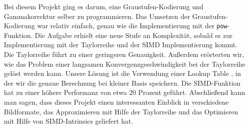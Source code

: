 \documentclass[course=erap]{aspdoc}
\begin{document}
\par
Bei diesem Projekt ging es darum, eine Graustufen-Kodierung und Gammakorrektur selber zu programmieren. Das Umsetzen der Graustufen-Kodierung war relativ einfach, genau wie die Implementierung mit der \texttt{pow}-Funktion. Die Aufgabe erhielt eine neue Stufe an Komplexität, sobald es zur Implementierung mit der Taylorreihe und der SIMD Implementierung kommt. Die Taylorreihe führt zu einer geringeren Genauigkeit. Außerdem erörterten wir, wie das Problem einer langsamen Konvergenzgeschwindigkeit bei der Taylorreihe gelöst werden kann. Unsere Lösung ist die Verwendung einer Lookup Table \cite{jungck2011packetC}, in der wir die genaue Berechnung bei kleiner Basis speichern. Die SIMD-Funktion hat zu einer höhere Performanz von etwa 20 Prozent geführt. Abschließend kann man sagen, dass dieses Projekt einen interessanten Einblick in verschiedene Bildformate, das Approximieren mit Hilfe der Taylorreihe und das Optimieren mit Hilfe von SIMD-Intrinsics geliefert hat.




\end{document}
